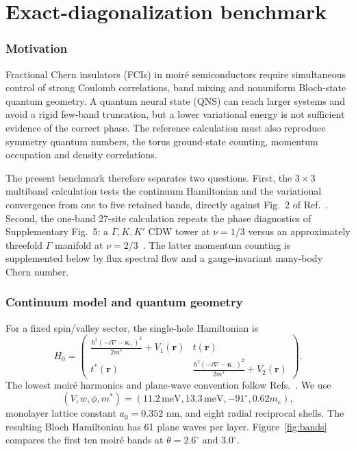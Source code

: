 \documentclass[10pt,twocolumn]{article}
\begin{document}
\part{Exact-diagonalization benchmark}

\section{Motivation}

Fractional Chern insulators (FCIs) in moir\'e semiconductors require simultaneous control of strong Coulomb correlations, band mixing and nonuniform Bloch-state quantum geometry.  A quantum neural state (QNS) can reach larger systems and avoid a rigid few-band truncation, but a lower variational energy is not sufficient evidence of the correct phase.  The reference calculation must also reproduce symmetry quantum numbers, the torus ground-state counting, momentum occupation and density correlations.

The present benchmark therefore separates two questions.  First, the $3\times3$ multiband calculation tests the continuum Hamiltonian and the variational convergence from one to five retained bands, directly against Fig.~2 of Ref.~\cite{luo}.  Second, the one-band 27-site calculation repeats the phase diagnostics of Supplementary Fig.~5: a $\Gamma,K,K'$ CDW tower at $\nu=1/3$ versus an approximately threefold $\Gamma$ manifold at $\nu=2/3$~\cite{luo}.  The latter momentum counting is supplemented below by flux spectral flow and a gauge-invariant many-body Chern number.

\section{Continuum model and quantum geometry}

For a fixed spin/valley sector, the single-hole Hamiltonian is
\begin{equation}
H_0=\begin{pmatrix}
\frac{\hbar^2(-i\nabla-\bm\kappa_+)^2}{2m^*}+V_1(\bm r)&t(\bm r)\\
t^*(\bm r)&\frac{\hbar^2(-i\nabla-\bm\kappa_-)^2}{2m^*}+V_2(\bm r)
\end{pmatrix}.
\end{equation}
The lowest moir\'e harmonics and plane-wave convention follow Refs.~\cite{reddy,luo}.  We use
\begin{equation}
(V,w,\phi,m^*)=(11.2\,\mathrm{meV},13.3\,\mathrm{meV},-91^\circ,0.62m_e),
\end{equation}
monolayer lattice constant $a_0=0.352$ nm, and eight radial reciprocal shells.  The resulting Bloch Hamiltonian has 61 plane waves per layer.  Figure~\ref{fig:bands} compares the first ten moir\'e bands at $\theta=2.6^\circ$ and $3.0^\circ$.
\end{document}
